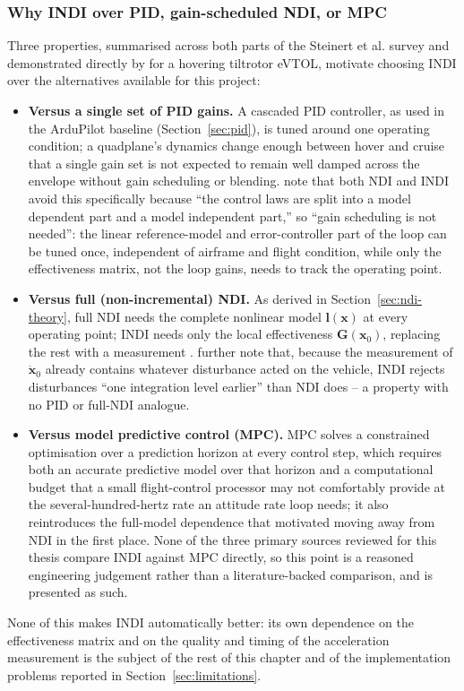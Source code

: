 \documentclass{article}
\begin{document}
\subsubsection{Why INDI over PID, gain-scheduled NDI, or MPC}
\label{sec:why-indi}
Three properties, summarised across both parts of the Steinert et al. survey and demonstrated directly by \citet{lombaerts2019} for a hovering tiltrotor eVTOL, motivate choosing INDI over the alternatives available for this project:
\begin{itemize}
    \item \textbf{Versus a single set of PID gains.} A cascaded PID controller, as used in the ArduPilot baseline (Section~\ref{sec:pid}), is tuned around one operating condition; a quadplane's dynamics change enough between hover and cruise that a single gain set is not expected to remain well damped across the envelope without gain scheduling or blending. \citet{lombaerts2019} note that both NDI and INDI avoid this specifically because ``the control laws are split into a model dependent part and a model independent part,'' so ``gain scheduling is not needed'': the linear reference-model and error-controller part of the loop can be tuned once, independent of airframe and flight condition, while only the effectiveness matrix, not the loop gains, needs to track the operating point.
    \item \textbf{Versus full (non-incremental) NDI.} As derived in Section~\ref{sec:ndi-theory}, full NDI needs the complete nonlinear model $\mathbf{l}(\mathbf{x})$ at every operating point; INDI needs only the local effectiveness $\mathbf{G}(\mathbf{x}_0)$, replacing the rest with a measurement \citep{steinertPart1_2025}. \citet{steinertPart1_2025} further note that, because the measurement of $\dot{\mathbf{x}}_0$ already contains whatever disturbance acted on the vehicle, INDI rejects disturbances ``one integration level earlier'' than NDI does -- a property with no PID or full-NDI analogue.
    \item \textbf{Versus model predictive control (MPC).} MPC solves a constrained optimisation over a prediction horizon at every control step, which requires both an accurate predictive model over that horizon and a computational budget that a small flight-control processor may not comfortably provide at the several-hundred-hertz rate an attitude rate loop needs; it also reintroduces the full-model dependence that motivated moving away from NDI in the first place. None of the three primary sources reviewed for this thesis compare INDI against MPC directly, so this point is a reasoned engineering judgement rather than a literature-backed comparison, and is presented as such.
\end{itemize}
None of this makes INDI automatically better: its own dependence on the effectiveness matrix and on the quality and timing of the acceleration measurement is the subject of the rest of this chapter and of the implementation problems reported in Section~\ref{sec:limitations}.
\end{document}
